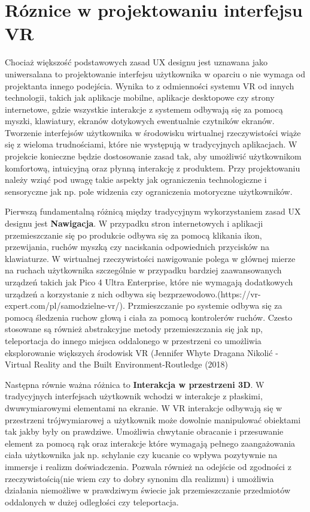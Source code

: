 \section{Róznice w projektowaniu interfejsu VR}
Chociaż większość podstawowych zasad UX designu jest uznawana jako uniwersalana to projektowanie interfejsu użytkownika w oparciu o nie wymaga od projektanta innego podejścia. Wynika to z odmienności systemu VR od innych technologii, takich jak aplikacje mobilne, aplikacje desktopowe czy strony internetowe, gdzie wszystkie interakcje z systemem odbywają się za pomocą myszki, klawiatury, ekranów dotykowych ewentualnie czytników ekranów. Tworzenie interfejsów użytkownika w środowisku wirtualnej rzeczywistości wiąże się z wieloma trudnościami, które nie występują w tradycyjnych aplikacjach. W projekcie konieczne będzie dostosowanie zasad tak, aby umożliwić użytkownikom komfortową, intuicyjną oraz płynną interakcję z produktem. Przy projektowaniu należy wziąć pod uwagę takie aspekty jak ograniczenia technologiczne i sensoryczne jak np. pole widzenia czy ograniczenia motoryczne użytkowników. 

Pierwszą fundamentalną różnicą między tradycyjnym wykorzystaniem zasad UX designu jest \textbf{Nawigacja}. W przypadku stron internetowych i aplikacji przemieszczanie się po produkcie odbywa się za pomocą klikania ikon, przewijania, ruchów myszką czy naciskania odpowiednich przycisków na klawiaturze. W wirtualnej rzeczywistości nawigowanie polega w głównej mierze na ruchach użytkownika szczególnie w przypadku bardziej zaawansowanych urządzeń takich jak  Pico 4 Ultra Enterprise, które nie wymagają dodatkowych urządzeń a korzystanie z nich odbywa się bezprzewodowo.(https://vr-expert.com/pl/samodzielne-vr/). Przmieszczanie po systemie odbywa się za pomocą śledzenia ruchow głową i ciała za pomocą kontrolerów ruchów. Czesto stosowane są również abstrakcyjne metody przemieszczania się jak np, teleportacja do innego miejsca oddalonego w przestrzeni co umożliwia eksplorowanie większych środowisk VR (Jennifer Whyte Dragana Nikolić - Virtual Reality and the Built Environment-Routledge (2018) 

Następna równie ważna różnica to \textbf{Interakcja w przestrzeni 3D}. W tradycyjnych interfejsach  użytkownik wchodzi w interakcje z płaskimi, dwuwymiarowymi elementami na ekranie. W VR interakcje odbywają się w przestrzeni trójwymiarowej a użytkownik może dowolnie manipulować  obiektami tak jakby były on prawdziwe. Umożliwia chwytanie obracanie i przesuwanie element za pomocą rąk oraz interakcje które wymagają pełnego zaangażowania ciała użytkownika jak np. schylanie czy kucanie co wpływa pozytywnie na immersje i realizm doświadczenia.
Pozwala również na odejście od zgodności z rzeczywistością(nie wiem czy  to dobry synonim dla realizmu) i umożliwia działania niemożliwe w prawdziwym świecie jak przemieszczanie przedmiotów oddalonych w dużej odległości czy teleportacja. 





